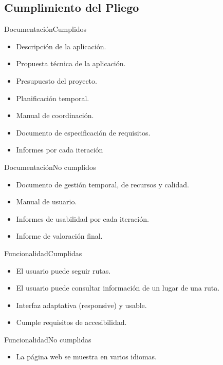 \documentclass{beamer}
\begin{document}
\subsection{Cumplimiento del Pliego}
\begin{frame}{Documentaci\'on}{Cumplidos}
\begin{itemize}
	\item {
		Descripci\'on de la aplicaci\'on.
	}
	\item {
		Propuesta t\'ecnica de la aplicaci\'on.
	}
	\item {
		Presupuesto del proyecto.
	}
	\item {
		Planificaci\'on temporal.
	}
	\item {
		Manual de coordinaci\'on.
	}
	\item{
		Documento de especificaci\'on de requisitos.
	}
	\item{
		Informes por cada iteraci\'on
	}
\end{itemize}

\end{frame}

\begin{frame}{Documentaci\'on}{No cumplidos}
\begin{itemize}
\item {
	Documento de gesti\'on temporal, de recursos y calidad.
}
\item {
	Manual de usuario.
}
\item {
	Informes de usabilidad por cada iteraci\'on.
}
\item {
	Informe de valoraci\'on final.
}
\end{itemize}

\end{frame}

\begin{frame}{Funcionalidad}{Cumplidas}
\begin{itemize}
\item {
El usuario puede seguir rutas.
}
\item {
El usuario puede consultar informaci\'on de un lugar de una ruta.
}
\item {
Interfaz adaptativa (responsive) y usable.
}
\item {
Cumple requisitos de accesibilidad.
}
\end{itemize}

\end{frame}

\begin{frame}{Funcionalidad}{No cumplidas}
\begin{itemize}
\item {
La p\'agina web se muestra en varios idiomas.
}
\end{itemize}

\end{frame}
\end{document}
